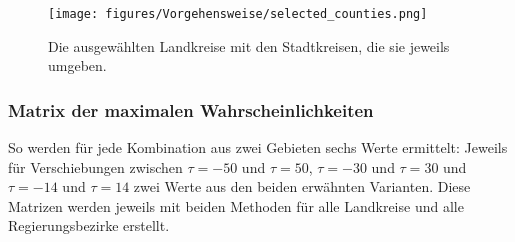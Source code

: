 \begin{figure}[H]
    \centering
    \texttt{[image: figures/Vorgehensweise/selected\_counties.png]}
    \caption{Die ausgewählten Landkreise mit den Stadtkreisen, die sie jeweils umgeben.}
    \label{fig:selected_counties}
\end{figure}

\subsubsection{Matrix der maximalen Wahrscheinlichkeiten}


So werden für jede Kombination aus zwei Gebieten sechs Werte ermittelt: Jeweils für Verschiebungen zwischen $\tau=-50$ und $\tau=50$, $\tau=-30$ und $\tau=30$ und $\tau=-14$ und $\tau=14$ zwei Werte aus den beiden erwähnten Varianten.
Diese Matrizen werden jeweils mit beiden Methoden für alle Landkreise und alle Regierungsbezirke erstellt.
